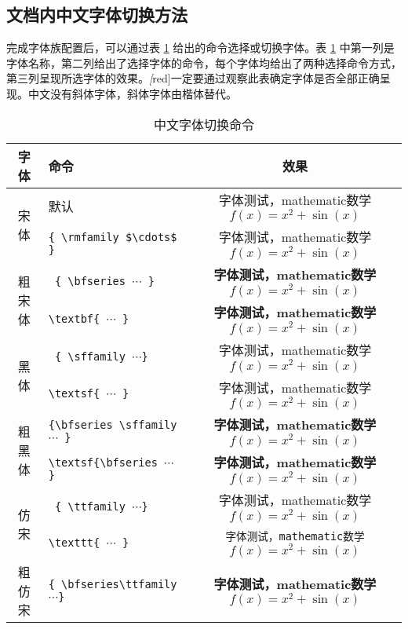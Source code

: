 \subsection{文档内中文字体切换方法}
    完成字体族配置后，可以通过表 \ref{tab:fontswitch_cmd} 给出的命令选择或切换字体。表 \ref{tab:fontswitch_cmd} 中第一列是字体名称，第二列给出了选择字体的命令，每个字体均给出了两种选择命令方式，第三列呈现所选字体的效果。\emph[red]{一定要通过观察此表确定字体是否全部正确呈现}。中文没有斜体字体，斜体字体由楷体替代。
    \def\testtext{字体测试，mathematic数学$f(x)=x^2+\sin(x)$}
    \begin{table}[!hpbt]
    \caption{中文字体切换命令}\label{tab:fontswitch_cmd}
    \footnotesize%
    \setlength{\tabcolsep}{4pt}%
    \begin{center}
    \begin{tabular}{c|l|c}
        \hline
        字体 & 命令 & 效果 \\
        \hline
        \multirow{2}{*}{宋体} & 默认 & \testtext \\
        \cline{2-3} & \verb|{ \rmfamily $\cdots$ }| & { \rmfamily \testtext}\\
        \hline
        \multirow{2}{*}{粗宋体} & \texttt{ \{ \textbackslash bfseries $\cdots$ \} } & {\bfseries \testtext }  \\
        \cline{2-3} & \texttt{\textbackslash textbf\{ $\cdots$ \} } & \textbf{\testtext} \\
        \hline
        \multirow{2}{*}{黑体} & \texttt{ \{ \textbackslash sffamily $\cdots$\}} & {\sffamily \testtext}  \\
        \cline{2-3} & \texttt{\textbackslash textsf\{ $\cdots$ \} } & \textsf{\testtext}\\
        \hline
        \multirow{2}{*}{粗黑体} & \texttt{\{\textbackslash bfseries \textbackslash sffamily $\cdots$ \}} & {\bfseries\sffamily \testtext}  \\
        \cline{2-3} & \texttt{\textbackslash textsf\{\textbackslash bfseries $\cdots$ \}} & \textsf{\bfseries \testtext}\\
        \hline
        \multirow{2}{*}{仿宋} & \texttt{ \{ \textbackslash ttfamily $\cdots$\}} & {\ttfamily \testtext}  \\
        \cline{2-3} & \texttt{\textbackslash texttt\{ $\cdots$ \}} & \texttt{\testtext}\\
        \hline
        \multirow{2}{*}{粗仿宋} & \texttt{\{ \textbackslash bfseries\textbackslash ttfamily $\cdots$\}} & {\bfseries \ttfamily \testtext}  \\

\end{tabular}
\end{center}
\end{table}
